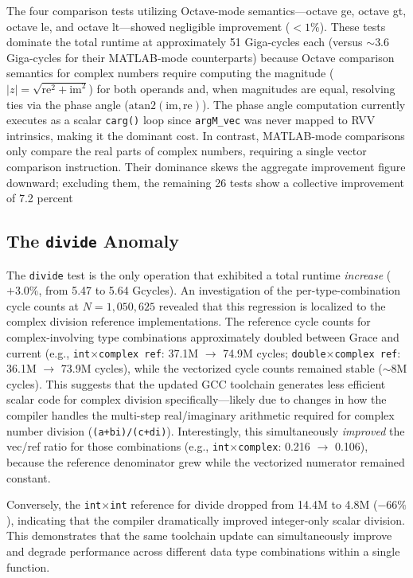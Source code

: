 The four comparison tests utilizing Octave-mode semantics—octave ge, octave gt, octave le, and octave lt—showed negligible improvement ($< 1\%$). These tests dominate the total runtime at approximately 51 Giga-cycles each (versus $\sim$3.6 Giga-cycles for their MATLAB-mode counterparts) because Octave comparison semantics for complex numbers require computing the magnitude ($|z| = \sqrt{\text{re}^2 + \text{im}^2}$) for both operands and, when magnitudes are equal, resolving ties via the phase angle ($\text{atan2}(\text{im}, \text{re})$). The phase angle computation currently executes as a scalar \texttt{carg()} loop since \texttt{argM\_vec} was never mapped to RVV intrinsics, making it the dominant cost. In contrast, MATLAB-mode comparisons only compare the real parts of complex numbers, requiring a single vector comparison instruction. Their dominance skews the aggregate improvement figure downward; excluding them, the remaining 26 tests show a collective improvement of 7.2 percent

\subsection{The \texttt{divide} Anomaly}

The \texttt{divide} test is the only operation that exhibited a total runtime \emph{increase} ($+3.0\%$, from 5.47 to 5.64 Gcycles). An investigation of the per-type-combination cycle counts at $N = 1{,}050{,}625$ revealed that this regression is localized to the complex division reference implementations. The reference cycle counts for complex-involving type combinations approximately doubled between Grace and current (e.g., \texttt{int$\times$complex ref}: 37.1M $\rightarrow$ 74.9M cycles; \texttt{double$\times$complex ref}: 36.1M $\rightarrow$ 73.9M cycles), while the vectorized cycle counts remained stable ($\sim$8M cycles). This suggests that the updated GCC toolchain generates less efficient scalar code for complex division specifically---likely due to changes in how the compiler handles the multi-step real/imaginary arithmetic required for complex number division (\texttt{(a+bi)/(c+di)}). Interestingly, this simultaneously \emph{improved} the vec/ref ratio for those combinations (e.g., \texttt{int$\times$complex}: 0.216 $\rightarrow$ 0.106), because the reference denominator grew while the vectorized numerator remained constant.

Conversely, the \texttt{int$\times$int} reference for divide dropped from 14.4M to 4.8M ($-66\%$), indicating that the compiler dramatically improved integer-only scalar division. This demonstrates that the same toolchain update can simultaneously improve and degrade performance across different data type combinations within a single function.

